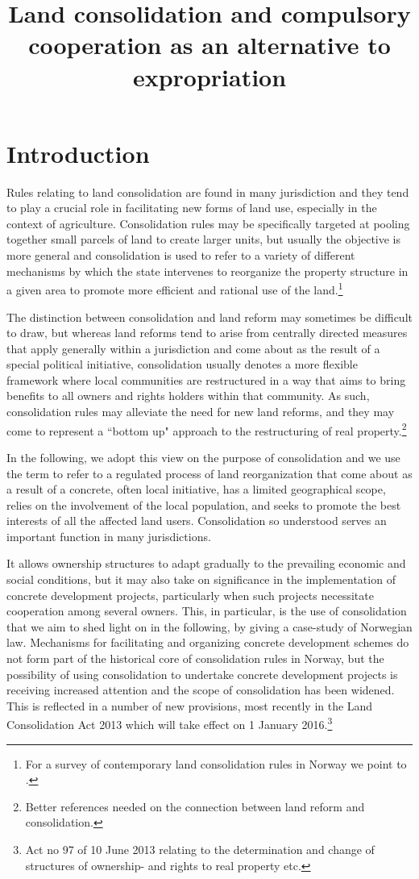 \title{Land consolidation and compulsory cooperation as an alternative to expropriation}

\section{Introduction}\label{intro}

Rules relating to land consolidation are found in many jurisdiction and they tend to play a crucial role in facilitating new forms of land use, especially in the context of agriculture. Consolidation rules may be specifically targeted at pooling together small parcels of land to create larger units, but usually the objective is more general and consolidation is used to refer to a variety of different mechanisms by which the state intervenes to reorganize the property structure in a given area to promote more efficient and rational use of the land.\footnote{For a survey of contemporary land consolidation rules in Norway we point to \cite{vittikainen2004}.}

The distinction between consolidation and land reform may sometimes be difficult to draw, but whereas land reforms tend to arise from centrally directed measures that apply generally within a jurisdiction and come about as the result of a special political initiative, consolidation usually denotes a more flexible framework where local communities are restructured in a way that aims to bring benefits to all owners and rights holders within that community. As such, consolidation rules may alleviate the need for new land reforms, and they may come to represent a ``bottom up" approach to the restructuring of real property.\footnote{Better references needed on the connection between land reform and consolidation.}

In the following, we adopt this view on the purpose of consolidation and we use the term to refer to a regulated process of land reorganization that come about as a result of a concrete, often local initiative, has a limited geographical scope, relies on the involvement of the local population, and seeks to promote the best interests of all the affected land users. Consolidation so understood serves an important function in many jurisdictions. 

It allows ownership structures to adapt gradually to the prevailing economic and social conditions, but it may also take on significance in the implementation of concrete development projects, particularly when such projects necessitate cooperation among several owners. This, in particular, is the use of consolidation that we aim to shed light on in the following, by giving a case-study of Norwegian law. Mechanisms for facilitating and organizing concrete development schemes do not form part of the historical core of consolidation rules in Norway, but the possibility of using consolidation to undertake concrete development projects is receiving increased attention and the scope of consolidation has been widened. This is reflected in a number of new provisions, most recently in the Land Consolidation Act 2013 which will take effect on 1 January 2016.\footnote{Act no 97 of 10 June 2013 relating to the determination and change of structures of ownership- and rights to real property etc.}

